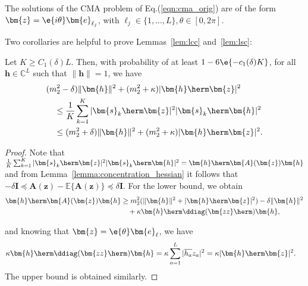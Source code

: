 The solutions of the CMA problem of Eq.(\ref{eqn:cma_orig}) are of the form $\bm{z}=\e{i\theta}\bm{e}_{\ell_j}$, with  $\ell_j\in\{1,\ldots,L\}, \theta\in[0,2\pi]$. 

Two corollaries are helpful to prove Lemmas~\ref{lem:lcc} and~\ref{lem:lsc}:
\begin{cor} \label{cor:absabs} %
	Let $K\geq C_1(\delta)L$. Then, with probability of at least $1-6\e{-c_1(\delta)K}$, for all $\bm{h}\in\mathbb{C}^L$ such that $\|\bm{h}\|=1$, we have
	\begin{align}
		&(m_2^2 - \delta)\|\bm{h}\|^2 + (m_2^2+\kappa)|\bm{h}\herm\bm{z}|^2 \nonumber\\
		&\quad\leq   \frac{1}{K}\sum_{k=1}^K|\bm{s}_k\herm\bm{z}|^2|\bm{s}_k\herm\bm{h}|^2 
		\nonumber\\&\quad
		\leq(m_2^2 +\delta)\|\bm{h}\|^2 + (m_2^2+\kappa)|\bm{h}\herm\bm{z}|^2. \nonumber%
	\end{align}
\end{cor}
\begin{proof}
	Note that 
	$
	\frac{1}{K}\sum_{k=1}^K|\bm{s}_k\herm\bm{z}|^2|\bm{s}_k\herm\bm{h}|^2=\bm{h}\herm\bm{A}(\bm{z})\bm{h} \nonumber
	$
	and from Lemma~\ref{lemma:concentration_hessian} it follows that $-\delta\bm{I}\preceq\textbf{}\bm{A}(\bm{z})-\mathbb{E}\{\bm{A}(\bm{z})\}\preceq\delta\bm{I}$. For the lower bound, we obtain
	\begin{align}
		\bm{h}\herm\bm{A}(\bm{z})\bm{h}&
		\geq m_2^2(\|\bm{h}\|^2+|\bm{h}\herm\bm{z}|^2) - \delta\|\bm{h}\|^2\nonumber\\
		&\quad+\kappa \bm{h}\herm\ddiag(\bm{zz}\herm)\bm{h},\nonumber %
	\end{align}
	
	and knowing that $\bm{z}=\e{\theta}\bm{e}_{\ell}$, we have
	\begin{align}
		&\kappa \bm{h}\herm\ddiag(\bm{zz}\herm)\bm{h}=\kappa \sum_{a=1}^L|\overline{h_a}z_a|^2=\kappa|\bm{h}\herm\bm{z}|^2.\nonumber%
	\end{align}
	The upper bound is obtained similarly.
\end{proof}

